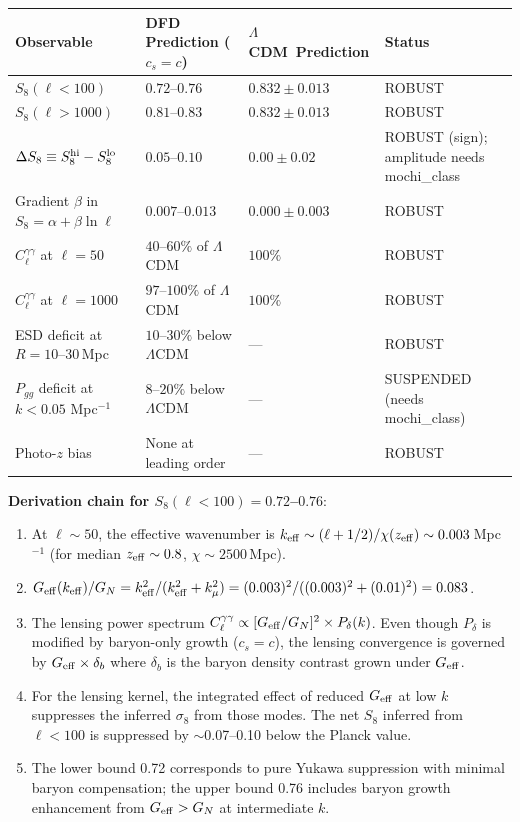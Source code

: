 \documentclass[11pt,a4paper]{article}
\newcommand{\LCDM}{$\Lambda$CDM}
\newcommand{\kmu}{k_\mu}
\newcommand{\Geff}{G_{\rm eff}}
\begin{document}
\begin{center}
\begin{tabular}{lp{4.5cm}p{4.5cm}l}
\toprule
\textbf{Observable} & \textbf{DFD Prediction ($c_s = c$)}
  & \textbf{\LCDM\ Prediction} & \textbf{Status} \\
\midrule
$S_8(\ell < 100)$ & $0.72$--$0.76$ & $0.832 \pm 0.013$ & ROBUST \\
$S_8(\ell > 1000)$ & $0.81$--$0.83$ & $0.832 \pm 0.013$ & ROBUST \\
$\Delta S_8 \equiv S_8^{\rm hi} - S_8^{\rm lo}$ & $0.05$--$0.10$ & $0.00 \pm 0.02$ & ROBUST (sign); amplitude needs mochi\_class \\
Gradient $\beta$ in $S_8 = \alpha + \beta\ln\ell$ & $0.007$--$0.013$ & $0.000 \pm 0.003$ & ROBUST \\
$C_\ell^{\gamma\gamma}$ at $\ell = 50$ & $40$--$60\%$ of \LCDM & $100\%$ & ROBUST \\
$C_\ell^{\gamma\gamma}$ at $\ell = 1000$ & $97$--$100\%$ of \LCDM & $100\%$ & ROBUST \\
ESD deficit at $R = 10$--30\,Mpc & $10$--$30\%$ below \LCDM & --- & ROBUST \\
$P_{gg}$ deficit at $k < 0.05$ Mpc$^{-1}$ & $8$--$20\%$ below \LCDM & --- & SUSPENDED (needs mochi\_class) \\
Photo-$z$ bias & None at leading order & --- & ROBUST \\
\bottomrule
\end{tabular}
\end{center}

\textbf{Derivation chain for $S_8(\ell < 100) = 0.72$--$0.76$}:
\begin{enumerate}[nosep]
\item At $\ell \sim 50$, the effective wavenumber is
  $k_{\rm eff} \sim (\ell + 1/2)/\chi(z_{\rm eff}) \sim 0.003$\,Mpc$^{-1}$
  (for median $z_{\rm eff} \sim 0.8$, $\chi \sim 2500$\,Mpc).
\item $\Geff(k_{\rm eff})/G_N = k_{\rm eff}^2/(k_{\rm eff}^2 + \kmu^2)
  = (0.003)^2/((0.003)^2 + (0.01)^2) = 0.083$.
\item The lensing power spectrum $C_\ell^{\gamma\gamma} \propto
  [\Geff/G_N]^2 \times P_\delta(k)$. Even though $P_\delta$ is
  modified by baryon-only growth ($c_s = c$), the lensing convergence
  is governed by $\Geff \times \delta_b$ where $\delta_b$ is the
  baryon density contrast grown under $\Geff$.
\item For the lensing kernel, the integrated effect of reduced
  $\Geff$ at low $k$ suppresses the inferred $\sigma_8$ from those modes.
  The net $S_8$ inferred from $\ell < 100$ is suppressed by
  $\sim$0.07--0.10 below the Planck value.
\item The lower bound 0.72 corresponds to pure Yukawa suppression
  with minimal baryon compensation; the upper bound 0.76 includes
  baryon growth enhancement from $\Geff > G_N$ at intermediate $k$.
\end{enumerate}
\end{document}
